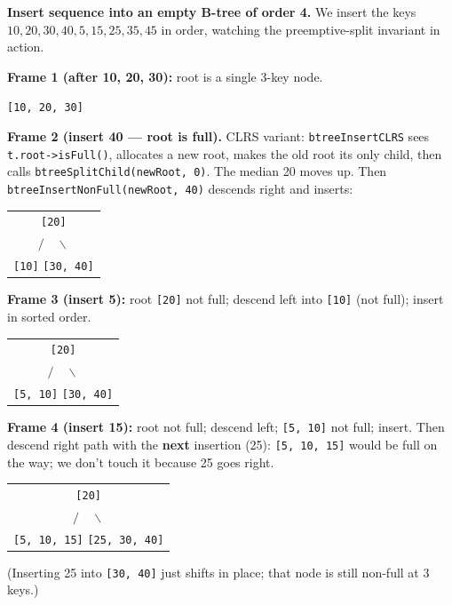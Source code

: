 \documentclass[11pt]{article}
\begin{document}
\begin{examplebox}
\textbf{Insert sequence into an empty B-tree of order 4.} We insert
the keys $10, 20, 30, 40, 5, 15, 25, 35, 45$ in order, watching the
preemptive-split invariant in action.

\textbf{Frame 1 (after 10, 20, 30):} root is a single 3-key node.
\begin{center}\texttt{[10, 20, 30]}\end{center}

\textbf{Frame 2 (insert 40 --- root is full).} CLRS variant:
\texttt{btreeInsertCLRS} sees \texttt{t.root->isFull()}, allocates a
new root, makes the old root its only child, then calls
\texttt{btreeSplitChild(newRoot, 0)}. The median 20 moves up.
Then \texttt{btreeInsertNonFull(newRoot, 40)} descends right and
inserts:
\begin{center}\begin{tabular}{c}
    \texttt{[20]} \\
    $/ \quad \backslash$ \\
    \texttt{[10]} \quad \texttt{[30, 40]}
\end{tabular}\end{center}

\textbf{Frame 3 (insert 5):} root \texttt{[20]} not full; descend
left into \texttt{[10]} (not full); insert in sorted order.
\begin{center}\begin{tabular}{c}
    \texttt{[20]} \\
    $/ \quad \backslash$ \\
    \texttt{[5, 10]} \quad \texttt{[30, 40]}
\end{tabular}\end{center}

\textbf{Frame 4 (insert 15):} root not full; descend left;
\texttt{[5, 10]} not full; insert. Then descend right path with the
\textbf{next} insertion (25): \texttt{[5, 10, 15]} would be full
on the way; we don't touch it because 25 goes right.
\begin{center}\begin{tabular}{c}
    \texttt{[20]} \\
    $/ \quad \backslash$ \\
    \texttt{[5, 10, 15]} \quad \texttt{[25, 30, 40]}
\end{tabular}\end{center}
(Inserting 25 into \texttt{[30, 40]} just shifts in place; that
node is still non-full at 3 keys.)


\end{examplebox}
\end{document}

